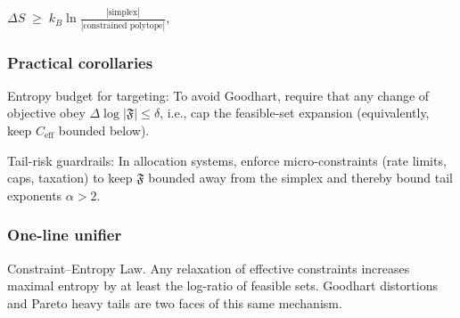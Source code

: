 \documentclass{article}
\begin{document}
$\Delta S \;\ge\; k_B \ln \frac{|\text{simplex}|}{|\text{constrained polytope}|}$,

\subsubsection{Practical corollaries}

Entropy budget for targeting: To avoid Goodhart, require that any change of objective obey $\Delta \log |\mathfrak{F}| \le \delta$, i.e., cap the feasible-set expansion (equivalently, keep $C_{\mathrm{eff}}$ bounded below).

Tail-risk guardrails: In allocation systems, enforce micro-constraints (rate limits, caps, taxation) to keep $\mathfrak{F}$ bounded away from the simplex and thereby bound tail exponents $\alpha>2$.

\subsubsection{One-line unifier}

Constraint–Entropy Law. Any relaxation of effective constraints increases maximal entropy by at least the log-ratio of feasible sets. Goodhart distortions and Pareto heavy tails are two faces of this same mechanism.



\end{document}
